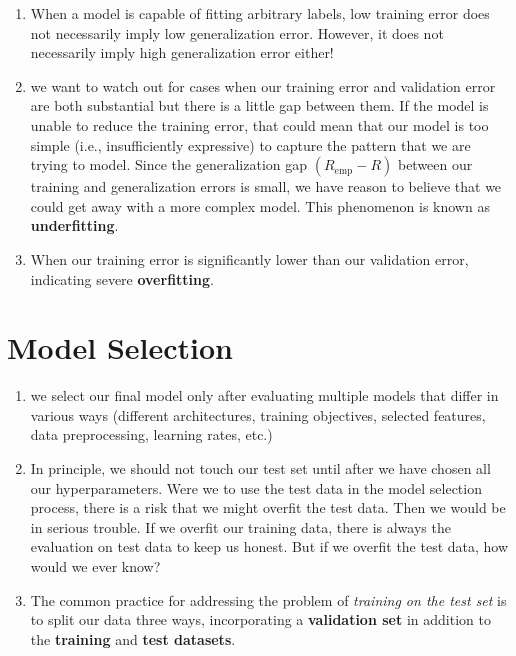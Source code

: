 \begin{enumerate}[itemsep=0.2cm]
    \item When a model is capable of fitting arbitrary labels, low training error does not necessarily imply low generalization error. However, it does not necessarily imply high generalization error either!

    \item we want to watch out for cases when our training error and validation error are both substantial but there is a little gap between them. If the model is unable to reduce the training error, that could mean that our model is too simple (i.e., insufficiently expressive) to capture the pattern that we are trying to model. Since the generalization gap $(R_\textrm{emp} - R)$ between our training and generalization errors is small, we have reason to believe that we could get away with a more complex model. This phenomenon is known as \textbf{underfitting}.

    \item When our training error is significantly lower than our validation error, indicating severe \textbf{overfitting}.

    
\end{enumerate}



\section{Model Selection \cite{dnn-1}}\label{Model Selection}

\begin{enumerate}[itemsep=0.2cm]
    \item we select our final model only after evaluating multiple models that differ in various ways (different architectures, training objectives, selected features, data preprocessing, learning rates, etc.)

    \item In principle, we should not touch our test set until after we have chosen all our hyperparameters. Were we to use the test data in the model selection process, there is a risk that we might overfit the test data. Then we would be in serious trouble. If we overfit our training data, there is always the evaluation on test data to keep us honest. But if we overfit the test data, how would we ever know?

    \item The common practice for addressing the problem of \textit{training on the test set} is to split our data three ways, incorporating a \textbf{validation set} in addition to the \textbf{training} and \textbf{test datasets}.

\end{enumerate}


